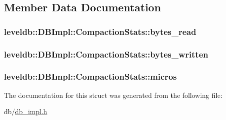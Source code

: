 \subsection{Member Data Documentation}
\hypertarget{structleveldb_1_1_d_b_impl_1_1_compaction_stats_a695c4b05f9ba991f2a5fa4fd801dbf53}{}
\subsubsection[{bytes\+\_\+read}]{ leveldb\+::\+D\+B\+Impl\+::\+Compaction\+Stats\+::bytes\+\_\+read}\label{structleveldb_1_1_d_b_impl_1_1_compaction_stats_a695c4b05f9ba991f2a5fa4fd801dbf53}
\hypertarget{structleveldb_1_1_d_b_impl_1_1_compaction_stats_a8a2b2fde9bec83da2a82b6981dfc036d}{}
\subsubsection[{bytes\+\_\+written}]{ leveldb\+::\+D\+B\+Impl\+::\+Compaction\+Stats\+::bytes\+\_\+written}\label{structleveldb_1_1_d_b_impl_1_1_compaction_stats_a8a2b2fde9bec83da2a82b6981dfc036d}
\hypertarget{structleveldb_1_1_d_b_impl_1_1_compaction_stats_a7c64b7eadf84a5e4a5ff6482df7cefa1}{}
\subsubsection[{micros}]{ leveldb\+::\+D\+B\+Impl\+::\+Compaction\+Stats\+::micros}\label{structleveldb_1_1_d_b_impl_1_1_compaction_stats_a7c64b7eadf84a5e4a5ff6482df7cefa1}


The documentation for this struct was generated from the following file\+:\begin{DoxyCompactItemize}
\item 
db/\hyperlink{db__impl_8h}{db\+\_\+impl.\+h}\end{DoxyCompactItemize}
